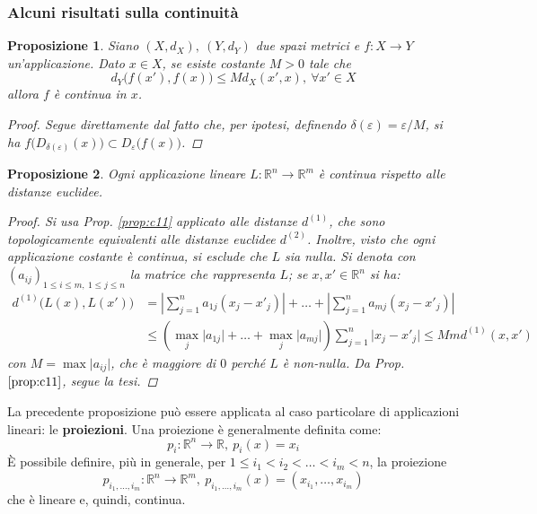 \documentclass[11pt]{scrartcl}
\theoremstyle{style1}
\newtheorem{prop}{Proposizione}[section]
\numberwithin{equation}{subsection}
\begin{document}
\subsubsection{Alcuni risultati sulla continuit\`a}
\begin{prop}
Siano $(X,d_X), \ (Y,d_Y)$ due spazi metrici e $f:X\to Y$ un'applicazione. Dato $x \in X$, se esiste costante $M>0$ tale che
\[
d_Y\big(f(x'), f(x)\big) \le Md_X(x',x), \ \forall x ' \in X
\] 
allora $f$ \`e continua in $x$.
\begin{proof}
	Segue direttamente dal fatto che, per ipotesi, definendo $\delta (\varepsilon ) = \varepsilon / M$, si ha $f\big(D_{\delta (\varepsilon )} (x)\big) \subset D_\varepsilon \big(f(x)\big)$.
\end{proof}
\end{prop}
\begin{prop}
	Ogni applicazione lineare $L : \mathbb{R}^n \to \mathbb{R}^m$ \`e continua rispetto alle distanze euclidee.
	\begin{proof}
		Si usa Prop. \ref{prop:c11} applicato alle distanze $d^{(1)} $, che sono topologicamente equivalenti alle distanze euclidee $d^{(2)} $. Inoltre, visto che ogni applicazione costante \`e continua, si esclude che $L$ sia nulla. Si denota con $(a_{ij} )_{1\le i\le m, \ 1\le j\le n} $ la matrice che rappresenta $L$; se $x, x' \in \mathbb{R}^n$ si ha:
		\[
			\begin{split}
				d^{(1)} \big(L(x) , L(x')\big)&= \left\lvert \sum_{j=1}^{n} a_{1j} (x_j-x'_j) \right\rvert + \ldots+ \left\lvert  \sum_{j=1}^{n} a_{mj} (x_j - x'_j) \right\rvert \\
						       &\le \left(\max_j \lvert a_{1j} \rvert+ \ldots +\max_j \lvert a_{mj}  \rvert   \right) \sum_{j=1}^{n} \lvert x_j - x'_j \rvert \le  Mm d^{(1)} (x,x')
			\end{split}
		\] 
		con $M=\max \lvert a_{ij}  \rvert$, che \`e maggiore di $0$ perch\'e $L$ \`e non-nulla. Da Prop. $\ref{prop:c11}$, segue la tesi.
	\end{proof}
\end{prop}
\noindent La precedente proposizione pu\`o essere applicata al caso particolare di applicazioni lineari: le \textbf{proiezioni}. Una proiezione \`e generalmente definita come:
\begin{equation}
	p_i:\mathbb{R}^n \to \mathbb{R}, \ p_i(x) = x_i
\end{equation}
\`E possibile definire, pi\`u in generale, per $1\le i_1 < i_2< \ldots<i_m <n$, la proiezione
\begin{equation}
	p_{i_1,\ldots,i_m}:\mathbb{R}^n \to \mathbb{R}^m, \  p_{i_1,\ldots,i_m} (x) = (x_{i_1} ,\ldots,x_{i_m} )
\end{equation}
che \`e lineare e, quindi, continua.
\end{document}

